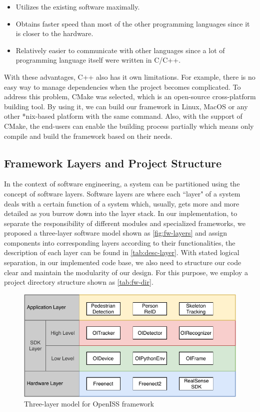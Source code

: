 \begin{itemize}
    \item Utilizes the existing software maximally.
    \item Obtains faster speed than most of the other programming languages 
    since it is closer to the hardware.
    \item Relatively easier to communicate with other languages since a lot of
    programming language itself were written in C/C++.
\end{itemize}

With these advantages, C++ also has it own limitations. For example, there is
no easy way to manage dependencies when the project becomes complicated.
To address this problem, CMake was selected, which is an open-source cross-platform building tool. By using it, we can build our framework in
Linux, MacOS or any other *nix-based platform with the same command.
Also, with the support of CMake, the end-users can enable the building process
partially which means only compile and build the framework based on their
needs.

\subsection{Framework Layers and Project Structure}
\label{sec:fw-inst-layer-strcut}

In the context of software engineering, a system can be partitioned using the
concept of software layers. Software layers are where each ``layer" of a system
deals with a certain function of a system which, usually, gets more and more
detailed as you burrow down into the layer stack. In our implementation, to separate the responsibility of different modules and specialized
frameworks, we proposed a three-layer software model shown as
\autoref{fig:fw-layers} and assign components into
corresponding layers according to their functionalities, the description of each
layer can be found in \autoref{tab:desc-layer}. With stated logical separation,
in our implemented code base, we also need to structure our code clear and
maintain the modularity of our design. For this purpose, we employ a project
directory structure shown as \autoref{tab:fw-dir}.

\begin{figure}
    \centering
    \includegraphics[width=\linewidth]{figures/framework_inst_layers.pdf}
    \caption{Three-layer model for OpenISS framework}
    \label{fig:fw-layers}
\end{figure}

